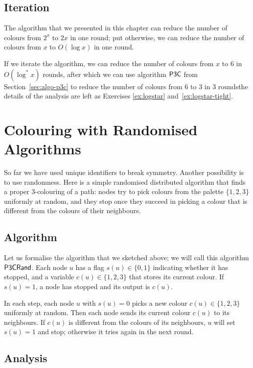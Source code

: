 \subsection{Iteration}

The algorithm that we presented in this chapter can reduce the number of colours from $2^x$ to $2x$ in one round; put otherwise, we can reduce the number of colours from $x$ to $O(\log x)$ in one round.

If we iterate the algorithm, we can reduce the number of colours from $x$ to $6$ in $O(\log^* x)$ rounds, after which we can use algorithm $\textup{\sffamily P3C}$ from Section~\ref{sec:algo-p3c} to reduce the number of colours from $6$ to $3$ in $3$ rounds\mydash the details of the analysis are left as Exercises \ref{ex:logstar} and~\ref{ex:logstar-tight}.


\section{Colouring with Randomised Algorithms}\label{sec:algo-p3crand}

So far we have used unique identifiers to break symmetry. Another possibility is to use randomness. Here is a simple randomised distributed algorithm that finds a proper $3$-colouring of a path: nodes try to pick colours from the palette $\{1,2,3\}$ uniformly at random, and they stop once they succeed in picking a colour that is different from the colours of their neighbours.


\subsection{Algorithm}

Let us formalise the algorithm that we sketched above; we will call this algorithm $\textup{\sffamily P3CRand}$. Each node $u$ has a flag $s(u) \in \{0,1\}$ indicating whether it has stopped, and a variable $c(u) \in \{1,2,3\}$ that stores its current colour. If $s(u) = 1$, a node has stopped and its output is $c(u)$.

In each step, each node $u$ with $s(u) = 0$ picks a new colour $c(u) \in \{1,2,3\}$ uniformly at random. Then each node sends its current colour $c(u)$ to its neighbours. If $c(u)$ is different from the colours of its neighbours, $u$ will set $s(u) = 1$ and stop; otherwise it tries again in the next round.


\subsection{Analysis}

